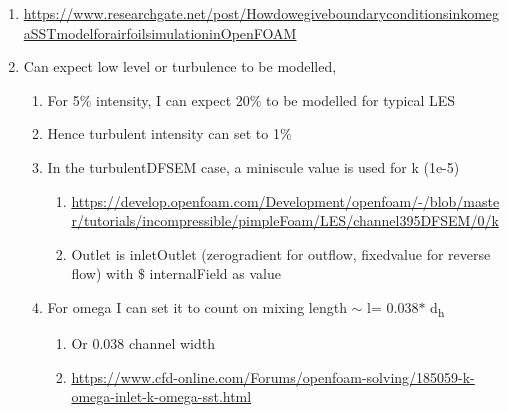 \documentclass[12pt]{article}
\renewcommand{\_}{\kern-1.5pt\textunderscore\kern-1.5pt}
\begin{document}
\begin{enumerate}
	\item \href{https://www.researchgate.net/post/How_do_we_give_boundary_conditions_in_k_omega_SST_model_for_airfoil_simulation_in_OpenFOAM}{https://www.researchgate.net/post/How\_do\_we\_give\_boundary\_conditions\_in\_k\_omega\_SST\_model\_for\_airfoil\_simulation\_in\_OpenFOAM}\par

	\item Can expect low level or turbulence to be modelled,\par

\begin{enumerate}
	\item For 5$\%$  intensity, I can expect 20$\%$  to be modelled for typical LES\par

	\item Hence turbulent intensity can set to 1$\%$ \par

	\item In the turbulentDFSEM case, a miniscule value is used for k (1e-5)\par

\begin{enumerate}
	\item \href{https://develop.openfoam.com/Development/openfoam/-/blob/master/tutorials/incompressible/pimpleFoam/LES/channel395DFSEM/0/k}{https://develop.openfoam.com/Development/openfoam/-/blob/master/tutorials/incompressible/pimpleFoam/LES/channel395DFSEM/0/k}\par

	\item Outlet is inletOutlet (zerogradient for outflow, fixedvalue for reverse flow) with $\$$ internalField as value\par


\end{enumerate}
	\item For omega I can set it to count on mixing length $ \sim $  l= 0.038$\ast$ d\textsubscript{h}\par

\begin{enumerate}
	\item Or 0.038 channel width \par

	\item \href{https://www.cfd-online.com/Forums/openfoam-solving/185059-k-omega-inlet-k-omega-sst.html}{https://www.cfd-online.com/Forums/openfoam-solving/185059-k-omega-inlet-k-omega-sst.html}\par


\end{enumerate}
\end{enumerate}
\end{enumerate}
\end{document}
